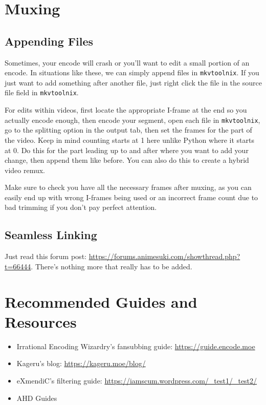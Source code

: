 \documentclass{scrartcl}
\begin{document}
\section{Muxing}

\subsection{Appending Files}

Sometimes, your encode will crash or you'll want to edit a small portion of an encode.  In situations like these, we can simply append files in \texttt{mkvtoolnix}.  If you just want to add something after another file, just right click the file in the source file field in \texttt{mkvtoolnix}.  

For edits within videos, first locate the appropriate I-frame at the end so you actually encode enough, then encode your segment, open each file in \texttt{mkvtoolnix}, go to the splitting option in the output tab, then set the frames for the part of the video.  Keep in mind counting starts at 1 here unlike Python where it starts at 0.  Do this for the part leading up to and after where you want to add your change, then append them like before.  You can also do this to create a hybrid video remux.

Make sure to check you have all the necessary frames after muxing, as you can easily end up with wrong I-frames being used or an incorrect frame count due to bad trimming if you don't pay perfect attention.

\subsection{Seamless Linking}

Just read this forum post: \url{https://forums.animesuki.com/showthread.php?t=66444}.  There's nothing more that really has to be added.

\section{Recommended Guides and Resources}
\begin{itemize}
	\item Irrational Encoding Wizardry's fansubbing guide: \url{https://guide.encode.moe}
	\item Kageru's blog: \url{https://kageru.moe/blog/}
	\item eXmendiC's filtering guide: \url{https://iamscum.wordpress.com/_test1/_test2/}
	\item AHD Guides
\end{itemize}
\end{document}
